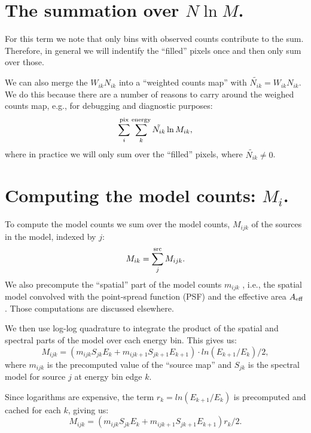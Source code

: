 \documentclass[preprint]{aastex}
\begin{document}
\section{The summation over $N \ln M$.}

For this term we note that only bins with observed counts contribute to the sum.
Therefore, in general we will indentify the ``filled'' pixels once and then
only sum over those. 

We can also merge the $W_{ik} N_{ik}$ into a ``weighted counts map'' with $\tilde{N_{ik}} = W_{ik} N_{ik}$.
We do this because there are a number of reasons to carry around the weighed counts map, 
e.g., for debugging and diagnostic purposes:
\begin{equation}
  \sum_i^{\rm pix} \sum_k^{\rm energy} \tilde{N_{ik}} \ln M_{ik},
\end{equation}
where in practice we will only sum over the ``filled'' pixels, where $\tilde{N_{ik}} \ne 0$.


\section{Computing the model counts: $M_i$.}

To compute the model counts we sum over the model counts, $M_{ijk}$ of the sources in the model, indexed by $j$:
\begin{equation}
  M_{ik} =  \sum_j^{\rm src} M_{ijk}.
\end{equation}
We also precompute the ``spatial'' part of the model counts $m_{ijk}$ , i.e., the spatial model convolved with the 
point-spread function (PSF) and the effective area $A_{\rm eff}$.  Those computations are discussed elsewhere.

We then use log-log quadrature to integrate the product of the spatial and spectral parts of the model over 
each energy bin.  This gives us:
\begin{equation}
  M_{ijk} = (m_{ijk} S_{jk} E_k +  m_{ijk+1} S_{jk+1} E_{k+1}) \cdot ln(E_{k+1}/E_{k}) / 2,
\end{equation}
where $m_{ijk}$ is the precomputed value of the ``source map'' and $S_{jk}$ is the spectral model for source $j$ at energy bin edge $k$.

Since logarithms are expensive, the term $r_k = ln(E_{k+1}/E_{k})$ is precomputed and cached for each $k$, giving us:
\begin{equation}
  M_{ijk} = (m_{ijk} S_{jk} E_k +  m_{ijk+1} S_{jk+1} E_{k+1}) r_k / 2.
\end{equation}
\end{document}
